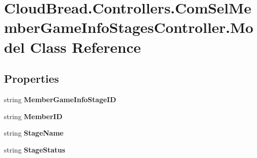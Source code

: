 \hypertarget{class_cloud_bread_1_1_controllers_1_1_com_sel_member_game_info_stages_controller_1_1_model}{}\section{Cloud\+Bread.\+Controllers.\+Com\+Sel\+Member\+Game\+Info\+Stages\+Controller.\+Model Class Reference}
\label{class_cloud_bread_1_1_controllers_1_1_com_sel_member_game_info_stages_controller_1_1_model}
\subsection*{Properties}
\begin{DoxyCompactItemize}
\item 
string {\bfseries Member\+Game\+Info\+Stage\+ID}\hypertarget{class_cloud_bread_1_1_controllers_1_1_com_sel_member_game_info_stages_controller_1_1_model_a809ebe9ece7a022c3b5cbba8ab2cdcdb}{}\label{class_cloud_bread_1_1_controllers_1_1_com_sel_member_game_info_stages_controller_1_1_model_a809ebe9ece7a022c3b5cbba8ab2cdcdb}

\item 
string {\bfseries Member\+ID}\hypertarget{class_cloud_bread_1_1_controllers_1_1_com_sel_member_game_info_stages_controller_1_1_model_a3292cdf41146702ac9a6edf52ab9cfe7}{}\label{class_cloud_bread_1_1_controllers_1_1_com_sel_member_game_info_stages_controller_1_1_model_a3292cdf41146702ac9a6edf52ab9cfe7}

\item 
string {\bfseries Stage\+Name}\hypertarget{class_cloud_bread_1_1_controllers_1_1_com_sel_member_game_info_stages_controller_1_1_model_a36469e37734b21f864be03b264c52082}{}\label{class_cloud_bread_1_1_controllers_1_1_com_sel_member_game_info_stages_controller_1_1_model_a36469e37734b21f864be03b264c52082}

\item 
string {\bfseries Stage\+Status}\hypertarget{class_cloud_bread_1_1_controllers_1_1_com_sel_member_game_info_stages_controller_1_1_model_a79b3e31f95322e5fc0ddb3bad4511246}{}\label{class_cloud_bread_1_1_controllers_1_1_com_sel_member_game_info_stages_controller_1_1_model_a79b3e31f95322e5fc0ddb3bad4511246}


\end{DoxyCompactItemize}
